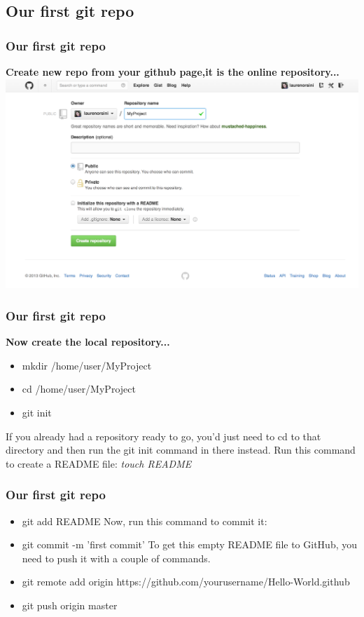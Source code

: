 \documentclass{beamer}
\begin{document}
\subsection{Our first git repo}
\begin{frame}
\frametitle{Our first git repo}
\textbf{Create new repo from your github page,it is the online repository...}
  \includegraphics[scale=0.25]{newrepo.png}
\end{frame}

\begin{frame}
\frametitle{Our first git repo}
\textbf{Now create the local repository...}
\vspace{1cm}
\begin{itemize}
 \item mkdir /home/user/MyProject
 \item cd /home/user/MyProject
 \item git init 
\end{itemize}
\small
\text If you already had a repository ready to go, you'd just need to cd to that directory and then run the git init command in there instead.
\newline
\newline
\text Run this command to create a README file:  \textit{touch README}
\end{frame}

\begin{frame}
\frametitle{Our first git repo}
\begin{itemize}
 \item git add README
 \text Now, run this command to commit it:
 \item git commit -m 'first commit'
 \text To get this empty README file to GitHub, you need to push it with a couple of commands.
 \item git remote add origin https://github.com/yourusername/Hello-World.github
 \item git push origin master
\end{itemize}
\end{frame}
\end{document}
